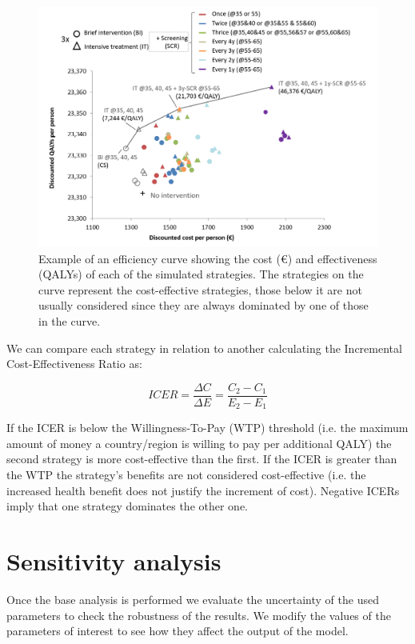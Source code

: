 \begin{figure}[h]
	\centering
	\includegraphics[width=\textwidth]{figures/lung_efficiency_curve}
	\decoRule
	\caption[Efficiency curve example]{Example of an efficiency curve showing the cost (€) and effectiveness (QALYs) of each of the simulated strategies. The strategies on the curve represent the cost-effective strategies, those below it are not usually considered since they are always dominated by one of those in the curve.}
	\label{fig:lung_efficiency_curve}
\end{figure}

We can compare each strategy in relation to another calculating the Incremental Cost-Effectiveness Ratio as:

$$
ICER=\frac{\Delta C}{\Delta E} = \frac{C_2-C_1}{E_2-E_1}
$$

If the ICER is below the Willingness-To-Pay (WTP) threshold (i.e. the maximum amount of money a country/region is willing to pay per additional QALY) the second strategy is more cost-effective than the first. If the ICER is greater than the WTP the strategy’s benefits are not considered cost-effective (i.e. the increased health benefit does not justify the increment of cost). Negative ICERs imply that one strategy dominates the other one.

\section{Sensitivity analysis}
Once the base analysis is performed we evaluate the uncertainty of the used parameters to check the robustness of the results. We modify the values of the parameters of interest to see how they affect the output of the model.

